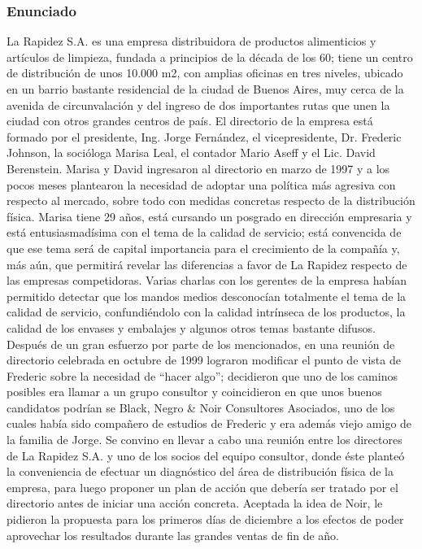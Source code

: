 \documentclass[a4paper,10pt]{article}
\begin{document}
	\subsubsection{Enunciado}
	La Rapidez S.A. es una empresa distribuidora de productos alimenticios y artículos de limpieza, fundada a principios de la década de los 60; tiene un centro de distribución de unos 10.000 m2, con amplias oficinas en tres niveles, ubicado en un barrio bastante residencial de la ciudad de Buenos Aires, muy cerca de la avenida de circunvalación y del ingreso de dos importantes rutas que unen la ciudad con otros grandes centros de país. El directorio de la empresa está formado por el presidente, Ing. Jorge Fernández, el vicepresidente, Dr. Frederic Johnson, la socióloga Marisa Leal, el contador Mario Aseff y el Lic. David Berenstein. Marisa y David ingresaron al directorio en marzo de 1997 y a los pocos meses plantearon la necesidad de adoptar una política más agresiva con respecto al mercado, sobre todo con medidas concretas respecto de la distribución física. Marisa tiene 29 años, está cursando un posgrado en dirección empresaria y está entusiasmadísima con el  tema de la calidad de servicio; está convencida de que ese tema será de capital importancia para el crecimiento de la compañía y, más aún, que permitirá revelar las diferencias a favor de La Rapidez respecto de las empresas competidoras. Varias charlas con los gerentes de la empresa habían permitido detectar que los mandos medios desconocían totalmente el tema de la calidad de servicio, confundiéndolo con la calidad intrínseca de los productos, la calidad de los envases y embalajes y algunos otros temas bastante difusos.\\Despu\'es de un gran esfuerzo por parte de los mencionados, en una reunión de directorio celebrada en octubre de 1999 lograron modificar el punto de vista de Frederic sobre la necesidad de “hacer algo”; decidieron que uno de los caminos posibles era llamar a un grupo consultor y coincidieron en que unos buenos candidatos podrían se Black, Negro \& Noir Consultores Asociados, uno de los cuales había sido compañero de estudios de Frederic y era además viejo amigo de la familia de Jorge. Se convino en llevar a cabo una reunión entre los directores de La Rapidez S.A. y uno de los socios del equipo consultor, donde éste planteó la conveniencia de efectuar un diagnóstico del área de distribución física de la empresa, para luego proponer un plan de acción que debería ser tratado por el directorio antes de iniciar una acción concreta. Aceptada la idea de Noir, le pidieron la propuesta para los primeros días de diciembre a los efectos de poder aprovechar los resultados durante las grandes ventas de fin de año.\\
\end{document}

